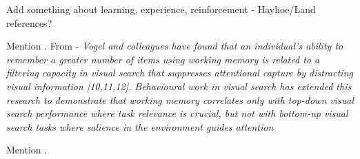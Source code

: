 \documentclass[]{rsos}%
\begin{document}
Add something about learning, experience, reinforcement - Hayhoe/Land references?


Mention \cite{vogel2008}.
From \cite{proulx2011} - \textit{Vogel and colleagues have found that an individual's ability to remember a greater number of items using working memory is related to a filtering capacity in visual search that suppresses attentional capture by distracting visual information [10,11,12]. Behavioural work in visual search has extended this research to
demonstrate that working memory correlates only with top-down
visual search performance where task relevance is crucial, but not
with  bottom-up  visual  search  tasks  where  salience  in  the
environment guides attention \cite{sobel2007}}


Mention \cite{stoet2011}.




\end{document}
